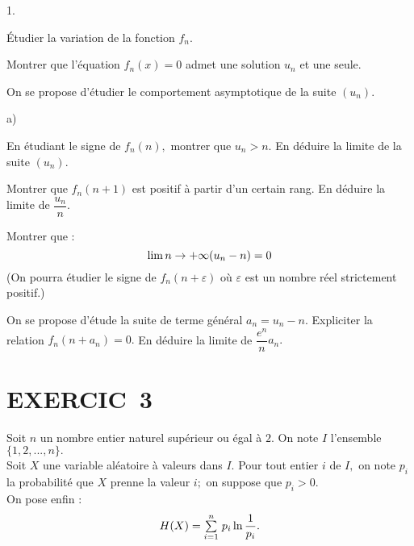 \documentclass[11pt]{article}%
\begin{document}
\begin{noliste}{1.}
 \setlength{\itemsep}{4mm}
\item Étudier la variation de la fonction $f_{n}.$

\item Montrer que l'équation $f_{n}(x) = 0$ admet une solution $u_{n}$
et une
seule.

\item On se propose d'étudier le comportement asymptotique de la suite
$(u_{n}).$

\begin{noliste}{a)}
 \setlength{\itemsep}{2mm}
\item En étudiant le signe de $f_{n}(n),$ montrer que $u_{n}>n.$ En
déduire
la limite de la suite $(u_{n}).$

\item Montrer que $f_{n}(n + 1)$ est positif à partir d'un certain
rang. En déduire la limite de $\dfrac{u_{n}}{n}.$

\item Montrer que :
\[
\lim{n\rightarrow + \infty }(u_{n}-n) = 0
\]
(On pourra étudier le signe de $f_{n}(n + \varepsilon )$ où
$\varepsilon $ est
un nombre réel strictement positif.)
\end{noliste}

\item On se propose d'étude la suite de terme général $a_{n} =
u_{n}-n.$
Expliciter la relation $f_{n}(n + a_{n}) = 0.$ En déduire la limite de
$\dfrac{e^{n}}{n}a_{n}.$
\end{noliste}

\section*{EXERCIC\E\ 3}

Soit $n$ un nombre entier naturel supérieur ou égal à $2.$ On note $I$
l'ensemble $\{1,2,...,n\}.$\\
Soit $X$ une variable aléatoire à valeurs dans $I.$ Pour tout entier
$i$ de $I,$ on note $p_{i}$ la probabilité que $X$ prenne la valeur
$i;$ on suppose
que $p_{i}>0.$\\
On pose enfin :
\[
H(X) = {\textstyle\sum\limits_{i = 1}^{n}}\hspace{.1cm}p_{i}\ln \dfrac{1}{p_{i}}.
\]
\end{document}
